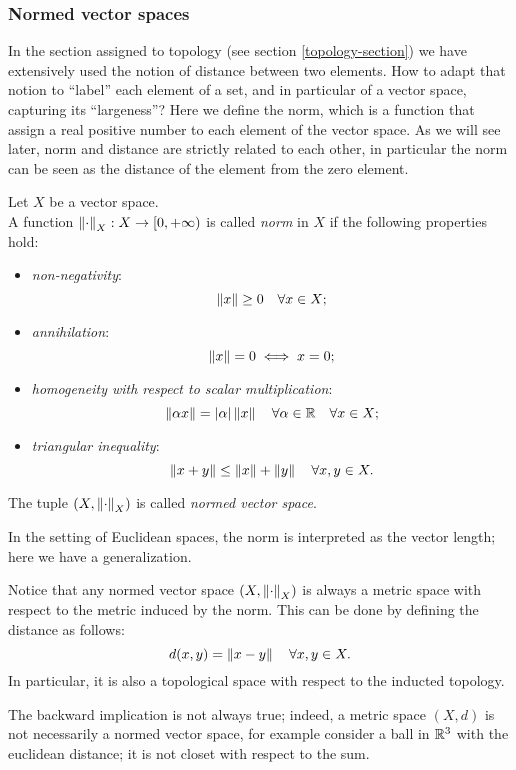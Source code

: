 \subsubsection{Normed vector spaces} In the section assigned to topology (see section \vref{topology-section}) we have extensively used the notion of distance between two elements. How to adapt that notion to ``label'' each element of a set, and in particular of a vector space, capturing its ``largeness''? Here we define the norm, which is a function that assign a real positive number to each element of the vector space. As we will see later, norm and distance are strictly related to each other, in particular the norm can be seen as the distance of the element from the zero element.

\begin{defn}\label{defn-norm}
	Let $X$ be a vector space.\\
	A function $\left\lVert\cdot\right\rVert_X : X \to \left[0, +\infty\right)$ is called \emph{norm} in $X$ if the following properties hold:
	\begin{itemize}
		\item \emph{non-negativity}:
		$$
		\left\lVert x\right\rVert \geq 0
		\quad \forall x \in X
		;
		$$
		\item \emph{annihilation}:
		$$
		\left\lVert x\right\rVert=0 
		\iff x=0
		;
		$$
		\item \emph{homogeneity with respect to scalar multiplication}:
		$$
		\left\lVert\alpha x\right\rVert
		=|\alpha| \left\lVert x\right\rVert
		\quad \forall \alpha \in \mathbb R
		\quad \forall x \in X
		;
		$$ 
		\item \emph{triangular inequality}: 
		$$
		\left\lVert x+y\right\rVert
		\leq \left\lVert x\right\rVert+\left\lVert y\right\rVert
		\quad \forall x, y \in X
		.
		$$
	\end{itemize}
	
	The tuple $(X,\left\lVert\cdot\right\rVert_X)$ is called \emph{normed vector space}.
\end{defn}

In the setting of Euclidean spaces, the norm is interpreted as the vector length; here we have a generalization.

Notice that any normed vector space $(X,\left\lVert\cdot\right\rVert_X)$ is always a metric space with respect to the metric induced by the norm. This can be done by defining the distance as follows: $$d(x,y)=\left\lVert x-y\right\rVert \quad \forall x,y \in X.$$
In particular, it is also a topological space with respect to the inducted topology.

The backward implication is not always true; indeed, a metric space $(X,d)$ is not necessarily a normed vector space, for example consider a ball in $\mathbb R^3$ with the euclidean distance; it is not closet with respect to the sum.

